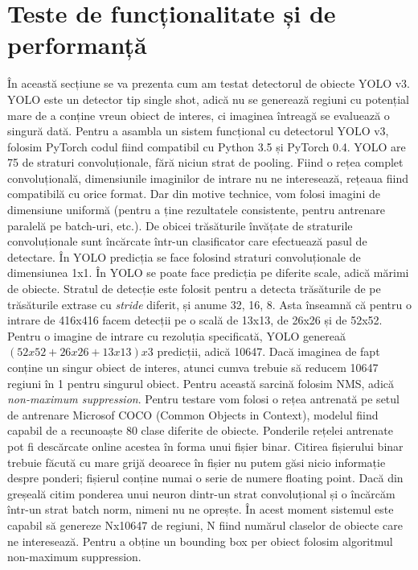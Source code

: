 \section{Teste de funcționalitate și de performanță}
În această secțiune se va prezenta cum am testat detectorul de obiecte YOLO v3. YOLO este un detector tip single shot, adică nu se generează regiuni cu potențial mare de a conține vreun obiect de interes, ci imaginea întreagă se evaluează o singură dată.\newline
Pentru a asambla un sistem funcțional cu detectorul YOLO v3, folosim PyTorch codul fiind compatibil cu Python 3.5 și PyTorch 0.4.\newline
YOLO are 75 de straturi convoluționale, fără niciun strat de pooling. Fiind o rețea complet convoluțională, dimensiunile imaginilor de intrare nu ne interesează, rețeaua fiind compatibilă cu orice format. Dar din motive technice, vom folosi imagini de dimensiune uniformă (pentru a ține rezultatele consistente, pentru antrenare paralelă pe batch-uri, etc.). De obicei trăsăturile învățate de straturile convoluționale sunt încărcate într-un clasificator care efectuează pasul de detectare. În YOLO predicția se face folosind straturi convoluționale de dimensiunea 1x1. În YOLO se poate face predicția pe diferite scale, adică mărimi de obiecte. Stratul de detecție este folosit pentru a detecta trăsăturile de pe trăsăturile extrase cu \textit{stride} diferit, și anume 32, 16, 8. Asta înseamnă că pentru o intrare de 416x416 facem detecții pe o scală de 13x13, de 26x26 și de 52x52. Pentru o imagine de intrare cu rezoluția specificată, YOLO genereaă $(52x52 + 26x26 + 13x13)x3$ predicții, adică 10647. Dacă imaginea de fapt conține un singur obiect de interes, atunci cumva trebuie să reducem 10647 regiuni în 1 pentru singurul obiect. Pentru această sarcină folosim NMS, adică \textit{non-maximum suppression}.\newline
Pentru testare vom folosi o rețea antrenată pe setul de antrenare Microsof COCO (Common Objects in Context), modelul fiind capabil de a recunoaște 80 clase diferite de obiecte. Ponderile rețelei antrenate pot fi descărcate online acestea în forma unui fișier binar. Citirea fișierului binar trebuie făcută cu mare grijă deoarece în fișier nu putem găsi nicio informație despre ponderi; fișierul conține numai o serie de numere floating point. Dacă din greșeală citim ponderea unui neuron dintr-un strat convoluțional și o încărcăm într-un strat batch norm, nimeni nu ne oprește.\newline
În acest moment sistemul este capabil să genereze Nx10647 de regiuni, N fiind numărul claselor de obiecte care ne interesează. Pentru a obține un bounding box per obiect folosim algoritmul non-maximum suppression.\newline
